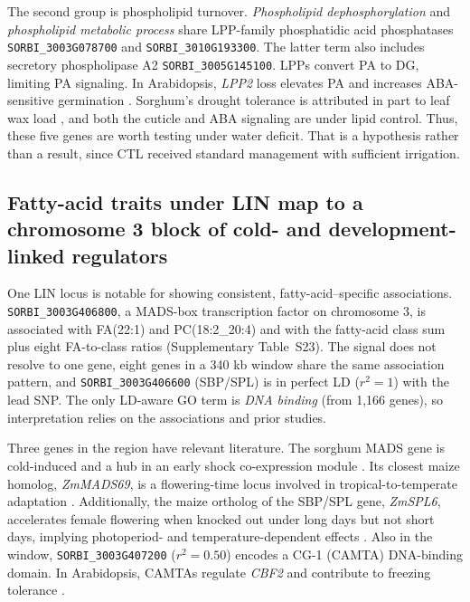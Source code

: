 \documentclass[9pt,twocolumn,twoside]{rilabRxiv}
\begin{document}
The second group is phospholipid turnover. \textit{Phospholipid dephosphorylation} and \textit{phospholipid metabolic process} share LPP-family phosphatidic acid phosphatases \texttt{SORBI\_3003G078700} and \texttt{SORBI\_3010G193300}. The latter term also includes secretory phospholipase A2 \texttt{SORBI\_3005G145100}. LPPs convert PA to DG, limiting PA signaling. In Arabidopsis, \textit{LPP2} loss elevates PA and increases ABA-sensitive germination \citep{Katagiri2005LPP2}. Sorghum's drought tolerance is attributed in part to leaf wax load \citep{Busta2021, Fontanet2025SorghumDrought}, and both the cuticle and ABA signaling are under lipid control. Thus, these five genes are worth testing under water deficit. That is a hypothesis rather than a result, since CTL received standard management with sufficient irrigation.

\subsection*{Fatty-acid traits under LIN map to a chromosome 3 block of cold- and development-linked regulators}

One LIN locus is notable for showing consistent, fatty-acid–specific associations. \texttt{SORBI\_3003G406800}, a MADS-box transcription factor on chromosome 3, is associated with FA(22:1) and PC(18:2\_20:4) and with the fatty-acid class sum plus eight FA-to-class ratios (Supplementary Table~S23). The signal does not resolve to one gene, eight genes in a 340 kb window share the same association pattern, and \texttt{SORBI\_3003G406600} (SBP/SPL) is in perfect LD ($r^2=1$) with the lead SNP. The only LD-aware GO term is \textit{DNA binding} (from 1,166 genes), so interpretation relies on the associations and prior studies.

Three genes in the region have relevant literature. The sorghum MADS gene is cold-induced and a hub in an early shock co-expression module \citep{Kurt2026ColdSorghum}. Its closest maize homolog, \textit{ZmMADS69}, is a flowering-time locus involved in tropical-to-temperate adaptation \citep{Liang2019ZmMADS69}. Additionally, the maize ortholog of the SBP/SPL gene, \textit{ZmSPL6}, accelerates female flowering when knocked out under long days but not short days, implying photoperiod- and temperature-dependent effects \citep{Jin2023ZmSPL6}. Also in the window, \texttt{SORBI\_3003G407200} ($r^2=0.50$) encodes a CG-1 (CAMTA) DNA-binding domain. In Arabidopsis, CAMTAs regulate \textit{CBF2} and contribute to freezing tolerance \citep{Doherty2009CAMTA}.
\end{document}
